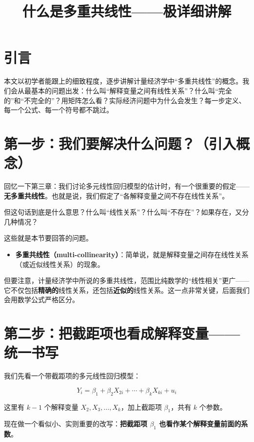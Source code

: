 \documentclass[12pt,a4paper]{ctexart}
\title{\textbf{什么是多重共线性——极详细讲解}}
\author{}
\date{}
\begin{document}
\maketitle

\section*{引言}

本文以初学者能跟上的细致程度，逐步讲解计量经济学中“多重共线性”的概念。我们会从最基本的问题出发：什么叫“解释变量之间有线性关系”？什么叫“完全的”和“不完全的”？用矩阵怎么看？实际经济问题中为什么会发生？每一步定义、每一个公式、每一个符号都不跳过。

\section*{第一步：我们要解决什么问题？（引入概念）}

回忆一下第三章：我们讨论多元线性回归模型的估计时，有一个很重要的假定——\textbf{无多重共线性}。也就是说，我们假定了“各解释变量之间不存在线性关系”。

但这句话到底是什么意思？什么叫“线性关系”？什么叫“不存在”？如果存在，又分几种情况？

这些就是本节要回答的问题。

\begin{itemize}
    \item \textbf{多重共线性（multi-collinearity）}：简单说，就是解释变量之间存在线性关系（或近似线性关系）的现象。
\end{itemize}

但要注意，计量经济学中所说的多重共线性，范围比纯数学的“线性相关”更广——它不仅包括\textbf{精确的}线性关系，还包括\textbf{近似的}线性关系。这一点非常关键，后面我们会用数学公式严格区分。

\section*{第二步：把截距项也看成解释变量——统一书写}

我们先看一个带截距项的多元线性回归模型：

\begin{equation}
Y_i = \beta_1 + \beta_2 X_{2i} + \cdots + \beta_k X_{ki} + u_i \label{eq:1}
\end{equation}

这里有 $k-1$ 个解释变量 $X_2, X_3, \ldots, X_k$，加上截距项 $\beta_1$，共有 $k$ 个参数。

现在做一个看似小、实则重要的改写：\textbf{把截距项 $\beta_1$ 也看作某个解释变量前面的系数}。
\end{document}
